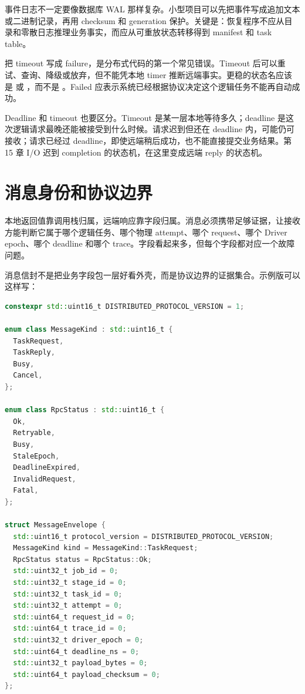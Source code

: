 事件日志不一定要像数据库 WAL 那样复杂。小型项目可以先把事件写成追加文本或二进制记录，再用 checksum 和 generation 保护。关键是：恢复程序不应从目录和零散日志推理业务事实，而应从可重放状态转移得到 manifest 和 task table。

把 timeout 写成 failure，是分布式代码的第一个常见错误。Timeout 后可以重试、查询、降级或放弃，但不能凭本地 timer 推断远端事实。更稳的状态名应该是  或 ，而不是 。Failed 应表示系统已经根据协议决定这个逻辑任务不能再自动成功。

Deadline 和 timeout 也要区分。Timeout 是某一层本地等待多久；deadline 是这次逻辑请求最晚还能被接受到什么时候。请求迟到但还在 deadline 内，可能仍可接收；请求已经过 deadline，即使远端稍后成功，也不能直接提交业务结果。第 15 章 I/O 迟到 completion 的状态机，在这里变成远端 reply 的状态机。

\section{消息身份和协议边界}

本地返回值靠调用栈归属，远端响应靠字段归属。消息必须携带足够证据，让接收方能判断它属于哪个逻辑任务、哪个物理 attempt、哪个 request、哪个 Driver epoch、哪个 deadline 和哪个 trace。字段看起来多，但每个字段都对应一个故障问题。

消息信封不是把业务字段包一层好看外壳，而是协议边界的证据集合。示例版可以这样写：

\begin{lstlisting}[language=C++,caption={消息信封的示例形态}]
constexpr std::uint16_t DISTRIBUTED_PROTOCOL_VERSION = 1;

enum class MessageKind : std::uint16_t {
  TaskRequest,
  TaskReply,
  Busy,
  Cancel,
};

enum class RpcStatus : std::uint16_t {
  Ok,
  Retryable,
  Busy,
  StaleEpoch,
  DeadlineExpired,
  InvalidRequest,
  Fatal,
};

struct MessageEnvelope {
  std::uint16_t protocol_version = DISTRIBUTED_PROTOCOL_VERSION;
  MessageKind kind = MessageKind::TaskRequest;
  RpcStatus status = RpcStatus::Ok;
  std::uint32_t job_id = 0;
  std::uint32_t stage_id = 0;
  std::uint32_t task_id = 0;
  std::uint32_t attempt = 0;
  std::uint64_t request_id = 0;
  std::uint64_t trace_id = 0;
  std::uint32_t driver_epoch = 0;
  std::uint64_t deadline_ns = 0;
  std::uint32_t payload_bytes = 0;
  std::uint64_t payload_checksum = 0;
};
\end{lstlisting}


